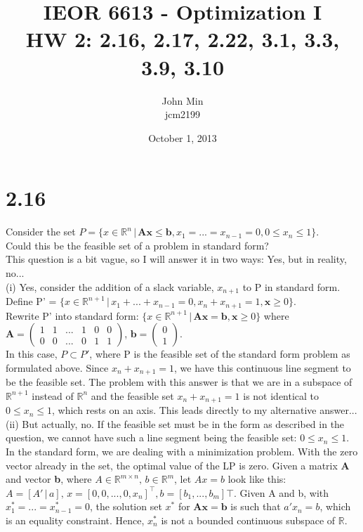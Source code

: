 \documentclass{article}
\begin{document}
\title{IEOR 6613 - Optimization I\\ HW 2:  2.16, 2.17, 2.22, 3.1, 3.3, 3.9, 3.10}

\author{John Min\\ jcm2199}
\date{October 1, 2013}
\maketitle
\pagebreak


\section*{2.16}
Consider the set $P = \{x \in \mathbb{R}^n \, |\, \mathbf{Ax \leq b}, x_1 = ... = x_{n-1} = 0, 0 \leq x_n \leq 1 \}$.  \\
Could this be the feasible set of a problem in standard form? \\

\noindent
This question is a bit vague, so I will answer it in two ways:  Yes, but in reality, no...  \\

\noindent
(i) Yes, consider the addition of a slack variable, $x_{n+1}$ to P in standard form. \\  Define P' = $\{x \in \mathbb{R}^{n+1} \, | \, x_1 + ... + x_{n-1} = 0, x_n + x_{n+1} = 1, \mathbf{x} \geq 0 \}$.  \\
Rewrite P' into standard form: $\{x \in \mathbb{R}^{n+1} \, | \, \mathbf{Ax = b}, \mathbf{x} \geq 0 \}$ where $\mathbf{A} = \begin{pmatrix}
	1 & 1 & ... & 1 & 0 & 0 \\
	0 & 0 & ... & 0 & 1 & 1 
	\end{pmatrix}
$, $\mathbf{b} = \begin{pmatrix}
	0\\
	1
	\end{pmatrix}
$.\\
In this case, $P \subset P'$, where P is the feasible set of the standard form problem as formulated above.  Since $x_n + x_{n+1} = 1$, we have this continuous line segment to be the feasible set.  The problem with this answer is that we are in a subspace of $\mathbb{R}^{n+1}$ instead of $\mathbb{R}^n$ and the feasible set $x_n + x_{n+1} = 1$ is not identical to $0 \leq x_n \leq 1$, which rests on an axis.
This leads directly to my alternative answer...\\

\noindent 
(ii) But actually, no.  If the feasible set must be in the form as described in the question, we cannot have such a line segment being the feasible set: $0 \leq x_n \leq 1$.  In the standard form, we are dealing with a minimization problem.  With the zero vector already in the set, the optimal value of the LP is zero.  Given a matrix \textbf{A} and vector \textbf{b}, where $A \in \mathbb{R}^{m \times n}, \, b \in \mathbb{R}^m$, let $Ax = b$ look like this:  $A = [A' \, | \, a], \, x = [0, 0, ..., 0, x_n]^\top, b = [b_1, ..., b_m]\top$.  Given A and b, with $x^*_1 = ... = x^*_{n-1} = 0$, the solution set $x^*$ for $\mathbf{Ax = b}$ is such that $a' x_n = b$, which is an equality constraint.  Hence, $x^*_n$ is not a bounded continuous subspace of $\mathbb{R}$.
\end{document}
